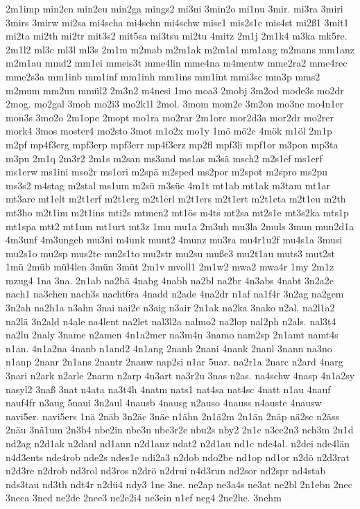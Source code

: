 {2m1imp
min2en
min2eu
min2ga
mings2
mi3ni
3min2o
mi1nu
3mir.
mi3ra
3miri
3mirs
3mirw
mi2sa
mi4scha
mi4schn
mi4schw
mise1
mis2s1c
mis4st
mi2ß1
3mit1
mi2ta
mi2th
mi2tr
mit3s2
mit5sa
mi3tsu
mi2tu
4mitz
2m1j
2m1k4
m3ka
mk5re.
2m1l2
ml3c
ml3l
ml3s
2m1m
m2mab
m2m1ak
m2m1al
mm1ang
m2mans
mm1anz
m2m1au
mmd2
mm1ei
mmeis3t
mme4lin
mme4na
m4mentw
mme2ra2
mme4rec
mme2s3a
mm1inb
mm1inf
mm1inh
mm1ins
mm1int
mmi3sc
mm3p
mms2
m2mum
mm2un
mmül2
2m3n2
m4nesi
1mo
moa3
2mobj
3m2od
mode3s
mo2dr
2mog.
mo2gal
3moh
mo2i3
mo2k1l
2mol.
3mom
mom2e
3m2on
mo3ne
mo4n1er
mon3s
3mo2o
2m1ope
2mopt
mo1ra
mo2rar
2m1orc
mor2d3a
mor2dr
mo2rer
mork4
3mos
moster4
mo2sto
3mot
m1o2x
mo1y
1mö
mö2c
4mök
m1öl
2m1p
m2pf
mp4f3erg
mpf3erp
mpf3err
mp4f3erz
mp2fl
mpf3li
mpf1or
m3pon
mp3ta
m3pu
2m1q
2m3r2
2m1s
m2san
ms3and
ms1as
m3sä
msch2
m2s1ef
ms1erf
ms1erw
ms1ini
mso2r
ms1ori
m2spä
m2sped
ms2por
m2spot
m2spro
ms2pu
ms3s2
m4stag
m2stal
ms1um
m2sü
m3süc
4m1t
mt1ab
mt1ak
m3tam
mt1ar
mt3are
mt1elt
m2t1erf
m2t1erg
m2t1erl
m2t1ers
m2t1ert
m2t1eta
m2t1eu
m2th
mt3ho
m2t1im
m2t1ins
mti2s
mtmen2
mt1ös
m4ts
mt2sa
mt2s1e
mt3s2ka
mts1p
mt1spa
mtt2
mt1um
mt1urt
mt3z
1mu
mu1a
2m3uh
mu3la
2muls
3mun
mun2d1a
4m3unf
4m3ungeb
mu3ni
m4unk
munt2
4munz
mu3ra
mu4r1u2f
mu4s1a
3musi
mu2s1o
mu2sp
mus2te
mu2s1to
mu2str
mu2su
muße3
mu2t1au
muts3
mut2st
1mü
2müb
mül4len
3mün
3müt
2m1v
mvoll1
2m1w2
mwa2
mwa4r
1my
2m1z
mzug4
1na
3na.
2n1ab
na2bä
4nabg
4nabh
na2bl
na2br
4n3abs
4nabt
3n2a2c
nach1
na3chen
nach3s
nacht6ra
4nadd
n2ade
4na2dr
n1af
na1f4r
3n2ag
na2gem
3n2ah
na2h1a
n3ahn
3nai
nai2e
n3aig
n3air
2n1ak
na2ka
3nako
n2al.
na2l1a2
na2lä
3n2ald
n4ale
na4lent
na2let
nal3l2a
nalmo2
na2lop
nal2ph
n2als.
nal3t4
na2lu
2naly
3name
n2amen
4n1a2mer
na3m4n
3namo
nam2sp
2n1amt
namt4s
n1an.
4n1a2na
4nanb
n1and2
4n1ang
2nanh
2nani
4nank
2nanl
3nann
na3no
n1anp
2nanr
2n1ans
2nantr
2nanw
nap2si
n1ar
5nar.
na2r1a
2narc
n2ard
4narg
3nari
n2ark
n2arle
2narm
n2arp
4n3art
na3r2u
3nas
n2as.
na4schw
4nasp
4n1a2sy
nasyl2
3naß
3nat
n4ata
na3t4h
4natm
nats1
nat4sa
nat4sc
4natt
n1au
4nauf
nauf4fr
n3aug
5naui
3n2aul
4nausb
4nausg
n2auso
4nauss
n4auste
4nausw
navi5er.
navi5ers
1nä
2näb
3n2äc
3näe
n1ähn
2n1ä2m
2n1än
2näp
nä2sc
n2äss
2näu
3nä1um
2n3b4
nbe2in
nbe3n
nbe3r2e
nbu2s
nby2
2n1c
n3ce2n3
nch3m
2n1d
nd2ag
n2d1ak
n2danl
nd1ann
n2d1anz
ndat2
n2d1au
nd1c
nde4al.
n2dei
nde4län
n4d3ents
nde4rob
nde2s
ndes1e
ndi2a3
n2dob
ndo2be
nd1op
nd1or
n2dö
n2d3rat
n2d3re
n2drob
nd3rol
nd3ros
n2drö
n2drui
n4d3run
nd2sor
nd2spr
nd4stab
nds3tau
nd3th
ndt4r
n2dü4
ndy3
1ne
3ne.
ne2ap
ne3a4s
ne3at
ne2bl
2n1ebn
2nec
3neca
3ned
ne2de
2nee3
ne2e2i4
ne3ein
n1ef
neg4
2ne2he.
3nehm
}
